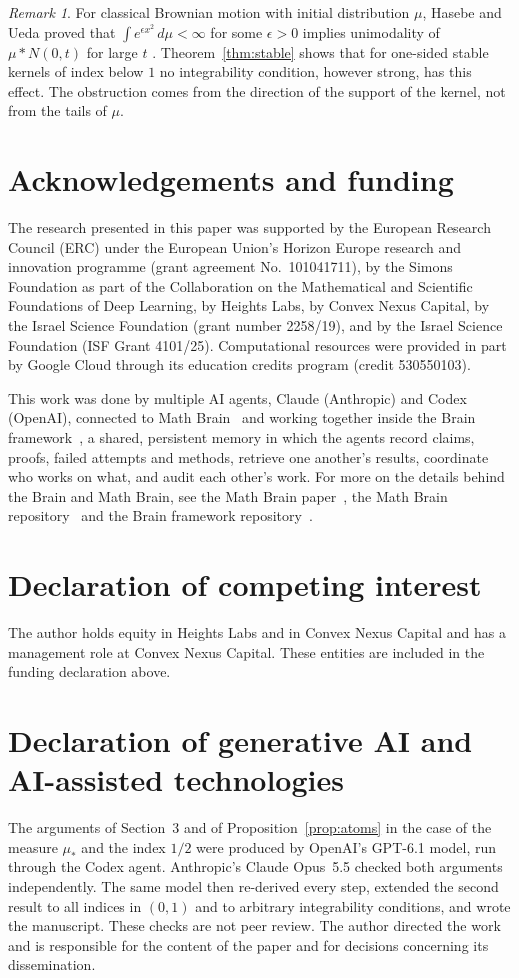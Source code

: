 \documentclass[11pt]{amsart}
\numberwithin{equation}{section}
\theoremstyle{definition}
\theoremstyle{remark}
\newtheorem{remark}[theorem]{Remark}
\begin{document}
\begin{remark}
For classical Brownian motion with initial distribution $\mu$, Hasebe and Ueda proved that $\int e^{\epsilon x^2}\,d\mu<\infty$ for some $\epsilon>0$ implies unimodality of $\mu\ast N(0,t)$ for large $t$ \cite[Theorem~1.3]{HU}. Theorem~\ref{thm:stable} shows that for one-sided stable kernels of index below $1$ no integrability condition, however strong, has this effect. The obstruction comes from the direction of the support of the kernel, not from the tails of $\mu$.
\end{remark}

\section*{Acknowledgements and funding}
The research presented in this paper was supported by the European Research
Council (ERC) under the European Union's Horizon Europe research and
innovation programme (grant agreement No.~101041711), by the Simons
Foundation as part of the Collaboration on the Mathematical and Scientific
Foundations of Deep Learning, by Heights Labs, by Convex Nexus Capital, by
the Israel Science Foundation (grant number 2258/19), and by the Israel
Science Foundation (ISF Grant 4101/25). Computational resources were
provided in part by Google Cloud through its education credits program
(credit 530550103).

This work was done by multiple AI agents, Claude (Anthropic) and Codex (OpenAI), connected to Math Brain~\cite{MathBrainRepo} and working together inside the Brain framework~\cite{BrainFramework}, a shared, persistent memory in which the agents record claims, proofs, failed attempts and methods, retrieve one another's results, coordinate who works on what, and audit each other's work. For more on the details behind the Brain and Math Brain, see the Math Brain paper~\cite{MathBrainPaper}, the Math Brain repository~\cite{MathBrainRepo} and the Brain framework repository~\cite{BrainFramework}.

\section*{Declaration of competing interest}
The author holds equity in Heights Labs and in Convex Nexus Capital and
has a management role at Convex Nexus Capital. These entities are included
in the funding declaration above.

\section*{Declaration of generative AI and AI-assisted technologies}
The arguments of Section~3 and of Proposition~\ref{prop:atoms} in the case of the measure $\mu_*$ and the index $1/2$ were produced by OpenAI's GPT-6.1 model, run through the Codex agent. Anthropic's Claude Opus~5.5 checked both arguments independently. The same model then re-derived every step, extended the second result to all indices in $(0,1)$ and to arbitrary integrability conditions, and wrote the manuscript. These checks are not peer review. The author directed the work and is responsible for the content of the paper and for decisions concerning its dissemination.
\end{document}
